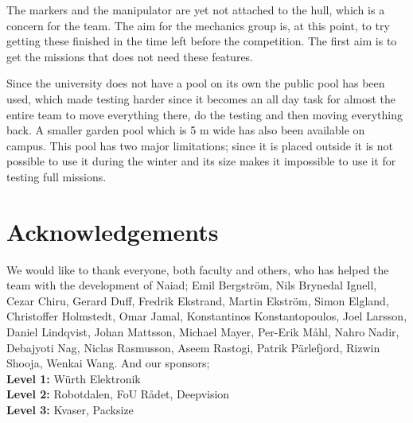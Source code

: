 \documentclass[twoside,12pt]{article}
\begin{document}
\begin{multicols*}{2}
The markers and the manipulator are yet not attached to the hull, which is a concern for the team. The aim for the mechanics group is, at this point, to try getting these finished in the time left before the competition. The first aim is to get the missions that does not need these features. 

Since the university does not have a pool on its own the public pool has been used, which made testing harder since it becomes an all day task for almost the entire team to move everything there, do the testing and then moving everything back. A smaller garden pool which is 5 m wide has also been available on campus. This pool has two major limitations; since it is placed outside it is not possible to use it during the winter and its size makes it impossible to use it for testing full missions. 
\section{Acknowledgements}
We would like to thank everyone, both faculty and others, who has helped the team with the development of Naiad; Emil Bergstr\"{o}m, Nils Brynedal Ignell, Cezar Chiru, Gerard Duff, Fredrik Ekstrand, Martin Ekstr\"{o}m, Simon Elgland, Christoffer Holmstedt, Omar Jamal, Konstantin​os Konstantop​oulos, Joel Larsson, Daniel Lindqvist, Johan Mattsson, Michael Mayer, Per-Erik M\aa hl, Nahro Nadir, Debajyoti Nag, Niclas Rasmusson, Aseem Rastogi, Patrik P\"{a}rlefjord, Rizwin Shooja, Wenkai Wang. And our sponsors; \\
\textbf{Level 1:} W\"{u}rth Elektronik \\
\textbf{Level 2:} Robotdalen, FoU R\aa det, Deepvision \\
\textbf{Level 3:} Kvaser, Packsize
%
%
\end{multicols*}
\end{document}
